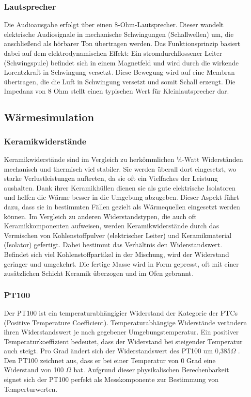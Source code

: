 \subsubsection{Lautsprecher}
Die Audioausgabe erfolgt über einen 8-Ohm-Lautsprecher.
Dieser wandelt elektrische Audiosignale in mechanische Schwingungen (Schallwellen) um, die anschließend als hörbarer Ton übertragen werden.
Das Funktionsprinzip basiert dabei auf dem elektrodynamischen Effekt: Ein stromdurchflossener Leiter (Schwingspule) befindet sich in einem
Magnetfeld und wird durch die wirkende Lorentzkraft in Schwingung versetzt.
Diese Bewegung wird auf eine Membran übertragen, die die Luft in Schwingung versetzt und somit Schall erzeugt.
Die Impedanz von 8 Ohm stellt einen typischen Wert für Kleinlautsprecher dar.

\subsection{Wärmesimulation} %
\subsubsection{Keramikwiderstände}
Keramikwiderstände sind im Vergleich zu herkömmlichen ¼-Watt Widerständen mechanisch und thermisch viel stabiler.
Sie werden überall dort eingesetzt, wo starke Verlustleistungen auftreten, da sie oft ein Vielfaches der Leistung aushalten.
Dank ihrer Keramikhüllen dienen sie als gute elektrische Isolatoren und helfen die Wärme besser in die Umgebung abzugeben.
Dieser Aspekt führt dazu, dass sie in bestimmten Fällen gezielt als Wärmequellen eingesetzt werden können.
\noindent 
Im Vergleich zu anderen Widerstandstypen, die auch oft Keramikkomponenten aufweisen, werden Keramikwiderstände durch das Vermischen von Kohlenstoffpulver 
(elektrischer Leiter) und Keramikmaterial (Isolator) gefertigt. Dabei bestimmt das Verhältnis den Widerstandswert. 
Befindet sich viel Kohlenstoffpartikel in der Mischung, wird der Widerstand geringer und umgekehrt.
Die fertige Masse wird in Form gepresst, oft mit einer zusätzlichen Schicht Keramik überzogen und im Ofen gebrannt. \cite{ohmite2024ceramic} \cite{nugar2026ceramic}
\subsubsection{PT100}
Der PT100 ist ein temperaturabhängigier Widerstand der Kategorie der PTCs (Positive Temperature Coefficient). Temperaturabhängige Widerstände verändern ihren 
Widerstandswert je nach gegebener Umgebungstemperatur. Ein positiver Temperaturkoeffizient bedeutet, dass der Widerstand bei steigender Temperatur 
auch steigt. Pro Grad ändert sich der Widerstandswert des 
PT100 um 0,385$\Omega$ \cite{yageo_pt100}. Den PT100 zeichnet aus, dass er bei einer Temperatur von 0 Grad eine Widerstand von 100 $\Omega$ hat.
Aufgrund dieser physikalischen Berechenbarkeit eignet sich der PT100 perfekt als Messkomponente zur Bestimmung von Temperturwerten. 






